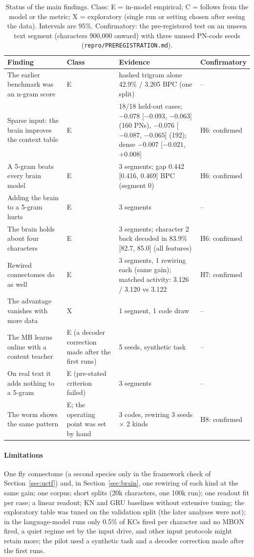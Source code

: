 \documentclass[conference]{IEEEtran}
\begin{document}
\begin{table}[t]
\caption{Status of the main findings.
Class: E = in-model empirical; C = follows from the model or the metric;
X = exploratory (single run or setting chosen after seeing the data).
Intervals are 95\%.
Confirmatory: the pre-registered test on an unseen text segment
(characters 900{,}000 onward) with three unused PN-code seeds
(\texttt{repro/PREREGISTRATION.md}).}
\label{tab:lmstatus}\centering\footnotesize\setlength{\tabcolsep}{3pt}
\begin{tabular}{@{}p{}p{}p{}p{}@{}}\toprule
Finding & Class & Evidence & Confirmatory\\\midrule
The earlier benchmark was an n-gram score & E & hashed trigram alone 42.9\% /
3.205 BPC (one split) & --\\
Sparse input: the brain improves the context table & E & 18/18 held-out cases;
$-0.078$ [$-0.093$, $-0.063$] (160 PNs), $-0.076$ [$-0.087$, $-0.065$] (192);
dense $-0.007$ [$-0.021$, $+0.008$] & H6: confirmed\\
A 5-gram beats every brain model & E & 3 segments; gap 0.442 [0.416, 0.469] BPC
(segment 0) & H6: confirmed\\
Adding the brain to a 5-gram hurts & E & 3 segments & --\\
The brain holds about four characters & E & 3 segments; character 2 back
decoded in 83.9\% [82.7, 85.0] (all features) & H6: confirmed\\
Rewired connectomes do as well & E & 3 segments, 1 rewiring each (same gain);
matched activity: 3.126 / 3.120 vs 3.122 & H7: confirmed\\
The advantage vanishes with more data & X & 1 segment, 1 code draw & --\\
The MB learns online with a content teacher & E (a decoder correction made
after the first runs) & 5 seeds, synthetic task & --\\
On real text it adds nothing to a 5-gram & E (pre-stated criterion failed) &
3 segments & --\\
The worm shows the same pattern & E; the operating point was set by hand &
3 codes, rewiring 3 seeds $\times$ 2 kinds & H8: confirmed\\\bottomrule
\end{tabular}
\end{table}

\paragraph*{Limitations} One fly connectome (a second species only in the
framework check of Section~\ref{sec:uctf}) and, in Section~\ref{sec:brain}, one
rewiring of each kind at the same gain; one corpus; short splits (20k characters, one 100k run); one readout fit per case;
a linear readout; KN and GRU baselines without extensive tuning; the
exploratory table was tuned on the validation split (the later analyses were
not); in the language-model runs only 0.5\% of KCs fired per character and no
MBON fired, a quiet regime set by the input drive, and other input protocols
might retain more; the pilot used a synthetic task and a decoder correction
made after the first runs.
\end{document}
